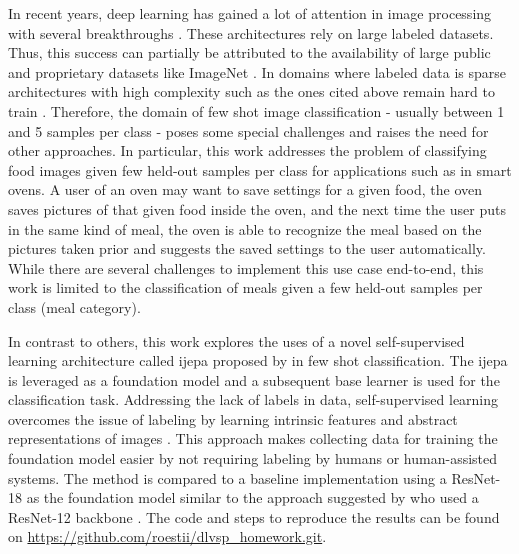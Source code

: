 In recent years, deep learning has gained a lot of attention in image processing with several breakthroughs
\cite{he_deep_2015, krizhevsky_imagenet_2012, tan_efficientnet_2020}. These architectures rely on large labeled datasets. 
Thus, this success can 
partially be attributed to the availability of large public and proprietary datasets like ImageNet \cite{deng_imagenet_2009}. 
In domains where labeled data is sparse architectures with high complexity such as the ones cited above 
remain hard to train \cite{brigato_close_2021}. Therefore, the domain of few shot image classification - 
usually between 1 and 5 samples per class - poses some special challenges and raises the need for other 
approaches. In particular, this work addresses the problem of classifying food images given few held-out 
samples per class for applications such as in smart ovens. A user of an oven may want to save settings for 
a given food, the oven saves pictures of that given food inside the oven, and the next time 
the user puts in the same kind of meal, the oven is able to recognize the meal based on the pictures taken 
prior and suggests the saved settings to the user automatically. While there are several challenges to implement 
this use case end-to-end, this work is limited to the classification of meals given a few held-out samples 
per class (meal category).

In contrast to others, this work explores the uses of a novel self-supervised learning architecture called 
\gls{ijepa} \cite{assran_self-supervised_2023} proposed by \citeauthor{assran_self-supervised_2023} 
in few shot classification. The \gls{ijepa} is leveraged as a foundation model and a subsequent base learner is 
used for the classification task.
Addressing the lack of labels in data, self-supervised learning overcomes the issue of labeling by learning
intrinsic features and abstract representations of images \cite{shwartz-ziv_what_2022}.
This approach makes collecting data for training the foundation model easier by not requiring labeling by humans 
or human-assisted systems. The method is compared to a baseline implementation using a ResNet-18 
as the foundation model similar to the approach suggested by
\citeauthor{tian_rethinking_2020} who used a ResNet-12 backbone \cite{tian_rethinking_2020}.
The code and steps to reproduce the results can be found on \url{https://github.com/roestii/dlvsp_homework.git}.

